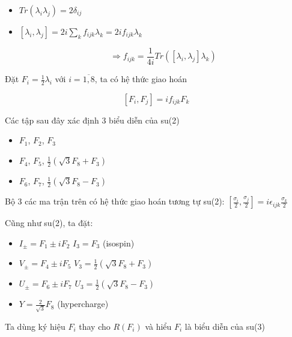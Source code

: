 \documentclass{report}
\begin{document}
	\begin{itemize}
		\item \( Tr \left( \lambda_{i} \lambda_{j} \right) = 2 \delta_{ij} \)
		\item \( \left[ \lambda_{i}, \lambda_{j} \right] = 2i \sum_{k} f_{ijk} \lambda_{k} = 2i f_{ijk} \lambda_{k} \)
		
		\[ \Rightarrow f_{ijk} = \frac{1}{4i} Tr \left( \left[ \lambda_{i}, \lambda_{j} \right] \lambda_{k} \right) \]
	\end{itemize}
		
	Đặt \( F_{i} = \frac{1}{2} \lambda_{i} \) với \( i = \overline{1, 8} \), ta có hệ thức giao hoán
	
	\[ \left[ F_{i}, F_{j} \right] = i f_{ijk} F_{k} \]
	
	Các tập sau đây xác định 3 biểu diễn của su(2)
	
	\begin{itemize}
		\item \( F_{1} \), \( F_{2} \), \( F_{3} \)
		\item \( F_{4} \), \( F_{5} \), \( \frac{1}{2} \left( \sqrt{3} F_{8} + F_{3} \right) \)
		\item \( F_{6} \), \( F_{7} \), \( \frac{1}{2} \left( \sqrt{3} F_{8} - F_{3} \right) \)
	\end{itemize}
	
	Bộ 3 các ma trận trên có hệ thức giao hoán tương tự su(2): \( \left[ \frac{\sigma_{i}}{2}, \frac{\sigma_{j}}{2} \right] = i \epsilon_{ijk} \frac{\sigma_{k}}{2} \)
	
	Cũng như su(2), ta đặt:
	
	\begin{itemize}
		\item \( I_{\pm} = F_{1} \pm i F_{2} \) \hspace*{1cm} \( I_{3} = F_{3} \) (isospin)
		\item \( V_{\pm} = F_{4} \pm i F_{5} \) \hspace*{1cm} \( V_{3} = \frac{1}{2} \left( \sqrt{3} F_{8} + F_{3} \right) \)
		\item \( U_{\pm} = F_{6} \pm i F_{7} \) \hspace*{1cm} \( U_{3} = \frac{1}{2} \left( \sqrt{3} F_{8} - F_{3} \right) \)
		\item \( Y = \frac{2}{\sqrt{3}} F_{8} \) (hypercharge)
	\end{itemize}
	
	Ta dùng ký hiệu \( F_{i} \) thay cho \( R(F_{i}) \) và hiểu \( F_{i} \) là biểu diễn của su(3)
	
\end{document}
